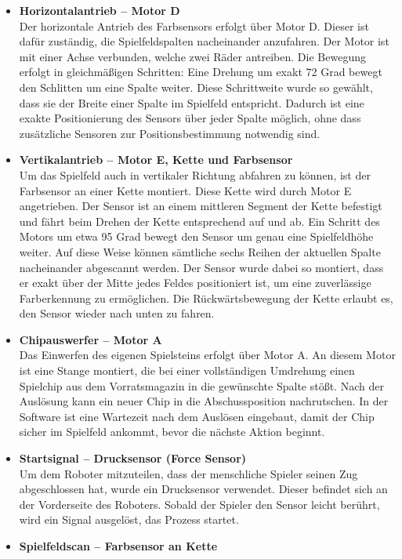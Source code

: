 \begin{itemize}
	\item \textbf{Horizontalantrieb – Motor D}\\
	Der horizontale Antrieb des Farbsensors erfolgt über Motor D. Dieser ist dafür zuständig, die Spielfeldspalten nacheinander anzufahren. Der Motor ist mit einer Achse verbunden, welche zwei Räder antreiben. Die Bewegung erfolgt in gleichmäßigen Schritten: Eine Drehung um exakt 72 Grad bewegt den Schlitten um eine Spalte weiter. Diese Schrittweite wurde so gewählt, dass sie der Breite einer Spalte im Spielfeld entspricht. Dadurch ist eine exakte Positionierung des Sensors über jeder Spalte möglich, ohne dass zusätzliche Sensoren zur Positionsbestimmung notwendig sind. 
	\item \textbf{Vertikalantrieb – Motor E, Kette und Farbsensor}\\
	 Um das Spielfeld auch in vertikaler Richtung abfahren zu können, ist der Farbsensor an einer Kette montiert. Diese Kette wird durch Motor E angetrieben. Der Sensor ist an einem mittleren Segment der Kette befestigt und fährt beim Drehen der Kette entsprechend auf und ab. Ein Schritt des Motors um etwa 95 Grad bewegt den Sensor um genau eine Spielfeldhöhe weiter. Auf diese Weise können sämtliche sechs Reihen der aktuellen Spalte nacheinander abgescannt werden. Der Sensor wurde dabei so montiert, dass er exakt über der Mitte jedes Feldes positioniert ist, um eine zuverlässige Farberkennung zu ermöglichen. Die Rückwärtsbewegung der Kette erlaubt es, den Sensor wieder nach unten zu fahren.
	\item \textbf{Chipauswerfer – Motor A}\\
	Das Einwerfen des eigenen Spielsteins erfolgt über Motor A. An diesem Motor ist eine Stange montiert, die bei einer vollständigen Umdrehung einen Spielchip aus dem Vorratsmagazin in die gewünschte Spalte stößt. Nach der Auslösung kann ein neuer Chip in die Abschussposition nachrutschen. In der Software ist eine Wartezeit nach dem Auslösen eingebaut, damit der Chip sicher im Spielfeld ankommt, bevor die nächste Aktion beginnt.
	\item \textbf{Startsignal – Drucksensor (Force Sensor)}\\
	Um dem Roboter mitzuteilen, dass der menschliche Spieler seinen Zug abgeschlossen hat, wurde ein Drucksensor verwendet. Dieser befindet sich an der Vorderseite des Roboters. Sobald der Spieler den Sensor leicht berührt, wird ein Signal ausgelöst, das Prozess startet. 
	\item \textbf{Spielfeldscan – Farbsensor an Kette}\\

\end{itemize}
